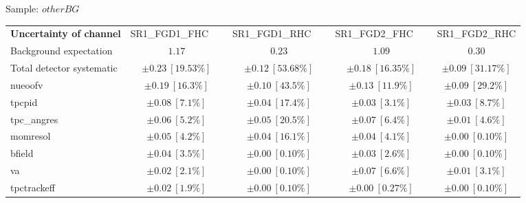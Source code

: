 
\begin{table}
{\large Sample: $otherBG$}
\begin{center}
\setlength{\tabcolsep}{0.0pc}
\begin{tabular*}{\textwidth}{@{\extracolsep{\fill}}lcccc}
\noalign{\smallskip}\hline\noalign{\smallskip}
{\bf Uncertainty of channel}                                    & {\small SR1\_FGD1\_FHC}~~~           & {\small SR1\_FGD1\_RHC}~~~            & {\small SR1\_FGD2\_FHC}~~~            & {\small SR1\_FGD2\_RHC}            \\
\noalign{\smallskip}\hline\noalign{\smallskip}
Background expectation             &  $1.17$        &  $0.23$        &  $1.09$        &  $0.30$       \\
Total detector systematic               & $\pm 0.23\ [19.53\%] $        & $\pm 0.12\ [53.68\%] $        & $\pm 0.18\ [16.35\%] $        & $\pm 0.09\ [31.17\%] $             \\
\noalign{\smallskip}\hline\noalign{\smallskip}
\noalign{\smallskip}\hline\noalign{\smallskip}
nueoofv         & $\pm 0.19\ [16.3\%] $          & $\pm 0.10\ [43.5\%] $          & $\pm 0.13\ [11.9\%] $          & $\pm 0.09\ [29.2\%] $       \\
tpcpid         & $\pm 0.08\ [7.1\%] $          & $\pm 0.04\ [17.4\%] $          & $\pm 0.03\ [3.1\%] $          & $\pm 0.03\ [8.7\%] $       \\
tpc\_angres         & $\pm 0.06\ [5.2\%] $          & $\pm 0.05\ [20.5\%] $          & $\pm 0.07\ [6.4\%] $          & $\pm 0.01\ [4.6\%] $       \\
momresol         & $\pm 0.05\ [4.2\%] $          & $\pm 0.04\ [16.1\%] $          & $\pm 0.04\ [4.1\%] $          & $\pm 0.00\ [0.10\%] $       \\
bfield         & $\pm 0.04\ [3.5\%] $          & $\pm 0.00\ [0.10\%] $          & $\pm 0.03\ [2.6\%] $          & $\pm 0.00\ [0.10\%] $       \\
va         & $\pm 0.02\ [2.1\%] $          & $\pm 0.00\ [0.10\%] $          & $\pm 0.07\ [6.6\%] $          & $\pm 0.01\ [3.1\%] $       \\
tpctrackeff         & $\pm 0.02\ [1.9\%] $          & $\pm 0.00\ [0.10\%] $          & $\pm 0.00\ [0.27\%] $          & $\pm 0.00\ [0.10\%] $       \\

\end{tabular*}
\end{center}
\end{table}
